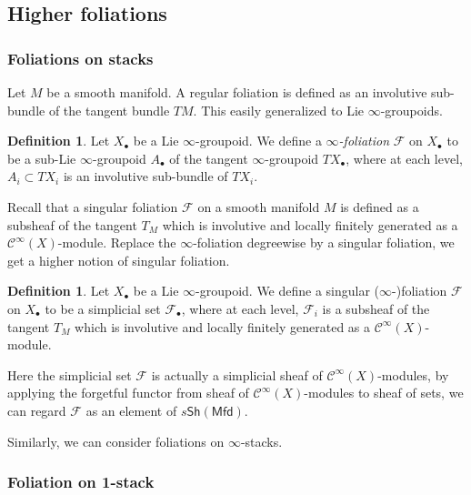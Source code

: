 \documentclass[12pt]{amsart}
\theoremstyle{definition}
\newtheorem{example}[thm]{Example}
\newtheorem{defn}[thm]{Definition}
\theoremstyle{remark}
\numberwithin{equation}{section}
\newcommand{\CF}{{\mathcal F}}
\newcommand{\cinf}{{\mathcal C}^{\infty}}
\newcommand{\1}{{\mathbb{1}}}
\newcommand{\mfd}{\mathsf{Mfd}}
\newcommand{\sh}{\mathsf{Sh}}
\begin{document}
\subsection{Higher foliations}

\subsubsection{Foliations on stacks}


Let $M$ be a smooth manifold. A regular foliation is defined as an involutive sub-bundle of the tangent bundle $TM$. This easily generalized to Lie $\infty$-groupoids.
\begin{defn}
	Let $X_{\bullet}$ be a Lie $\infty$-groupoid. We define a   {\it $\infty$-foliation} $\CF$ on $X_{\bullet}$ to be a sub-Lie $\infty$-groupoid $A_{\bullet}$ of the tangent $\infty$-groupoid $TX_{\bullet}$, where at each level, $A_i \subset TX_i$ is an involutive sub-bundle of $TX_i$.
\end{defn}
Recall that a singular foliation $\CF$ on a smooth manifold $M$ is defined as a subsheaf of the tangent $T_M$ which is involutive and locally finitely generated as a $\cinf(X)$-module. Replace the $\infty$-foliation degreewise by a singular foliation, we get a higher notion of singular foliation.
\begin{defn}
	Let $X_{\bullet}$ be a Lie $\infty$-groupoid. We define a singular  ($\infty$-)foliation $\CF$ on $X_{\bullet}$ to be a simplicial set $\CF_{\bullet}$, where at each level, $\CF_i$ is a subsheaf of the tangent $T_M$ which is involutive and locally finitely generated as a $\cinf(X)$-module.
\end{defn}
Here the simplicial set $\CF$ is actually a simplicial sheaf of $\cinf(X)$-modules, by applying the forgetful functor from sheaf of $\cinf(X)$-modules to sheaf of sets, we can regard $\CF$ as an element of $s\sh(\mfd)$.


Similarly, we can consider foliations on $\infty$-stacks.

\subsubsection{Foliation on 1-stack}

	
\end{document}
